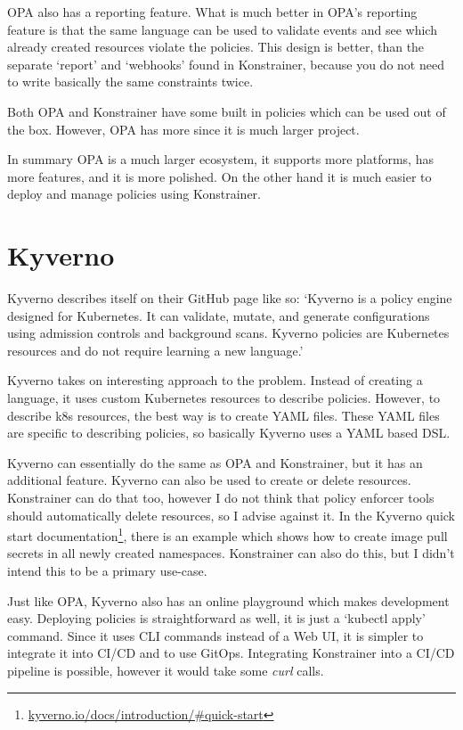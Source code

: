 OPA also has a reporting feature. What is much better in OPA's reporting feature is that the same language can be used to validate events and see which already created resources violate the policies. This design is better, than the separate `report' and `webhooks' found in Konstrainer, because you do not need to write basically the same constraints twice.

Both OPA and Konstrainer have some built in policies which can be used out of the box. However, OPA has more since it is much larger project.

In summary OPA is a much larger ecosystem, it supports more platforms, has more features, and it is more polished. On the other hand it is much easier to deploy and manage policies using Konstrainer.

\section{Kyverno}

Kyverno describes itself on their GitHub page like so:
`Kyverno is a policy engine designed for Kubernetes. It can validate, mutate, and generate configurations using admission controls and background scans. Kyverno policies are Kubernetes resources and do not require learning a new language.' \cite{Kyverno}

Kyverno takes on interesting approach to the problem. Instead of creating a language, it uses custom Kubernetes resources to describe policies. However, to describe k8s resources, the best way is to create YAML files. These YAML files are specific to describing policies, so basically Kyverno uses a YAML based DSL.

Kyverno can essentially do the same as OPA and Konstrainer, but it has an additional feature. Kyverno can also be used to create or delete resources. Konstrainer can do that too, however I do not think that policy enforcer tools should automatically delete resources, so I advise against it. In the Kyverno quick start documentation\footnote{\url{kyverno.io/docs/introduction/\#quick-start}}, there is an example which shows how to create image pull secrets in all newly created namespaces. Konstrainer can also do this, but I didn't intend this to be a primary use-case.

Just like OPA, Kyverno also has an online playground which makes development easy. Deploying policies is straightforward as well, it is just a `kubectl apply' command. Since it uses CLI commands instead of a Web UI, it is simpler to integrate it into CI/CD and to use GitOps. Integrating Konstrainer into a CI/CD pipeline is possible, however it would take some \emph{curl} calls.

